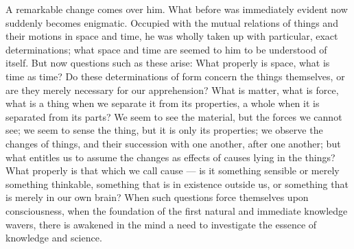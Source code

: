\documentclass[12pt]{book}
\begin{document}
A remarkable change comes over him. What before was immediately evident now
suddenly becomes enigmatic. Occupied with the mutual relations of things and
their motions in space and time, he was wholly taken up with particular,
exact determinations; what space and time are seemed to him to be understood
of itself. But now questions such as these arise: What properly is space,
what is time as time? Do these determinations of form concern the things
themselves, or are they merely necessary for our apprehension? What is
matter, what is force, what is a thing when we separate it from its
properties, a whole when it is separated from its parts? We seem to see the
material, but the forces we cannot see; we seem to sense the thing, but it is
only its properties; we observe the changes of things, and their succession
with one another, after one another; but what entitles us to assume the
changes as effects of causes lying in the things? What properly is that which
we call cause --- is it something sensible or merely something thinkable,
something that is in existence outside us, or something that is merely in our
own brain? When such questions force themselves upon consciousness, when the
foundation of the first natural and immediate knowledge wavers, there is
awakened in the mind a need to investigate the essence of knowledge and
science.
\end{document}
